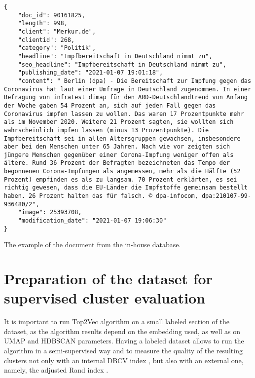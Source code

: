 \documentclass[fontsize=12pt,a4paper,twoside,openany]{scrbook}
\begin{document}
\begin{listing}[ht!]
\begin{verbatim}
{
    "doc_id": 90161825, 
    "length": 998, 
    "client": "Merkur.de", 
    "clientid": 268, 
    "category": "Politik", 
    "headline": "Impfbereitschaft in Deutschland nimmt zu", 
    "seo_headline": "Impfbereitschaft in Deutschland nimmt zu", 
    "publishing_date": "2021-01-07 19:01:18", 
    "content": " Berlin (dpa) - Die Bereitschaft zur Impfung gegen das Coronavirus hat laut einer Umfrage in Deutschland zugenommen. In einer Befragung von infratest dimap für den ARD-Deutschlandtrend von Anfang der Woche gaben 54 Prozent an, sich auf jeden Fall gegen das Coronavirus impfen lassen zu wollen. Das waren 17 Prozentpunkte mehr als im November 2020. Weitere 21 Prozent sagten, sie wollten sich wahrscheinlich impfen lassen (minus 13 Prozentpunkte). Die Impfbereitschaft sei in allen Altersgruppen gewachsen, insbesondere aber bei den Menschen unter 65 Jahren. Nach wie vor zeigten sich jüngere Menschen gegenüber einer Corona-Impfung weniger offen als ältere. Rund 36 Prozent der Befragten bezeichneten das Tempo der begonnenen Corona-Impfungen als angemessen, mehr als die Hälfte (52 Prozent) empfinden es als zu langsam. 70 Prozent erklärten, es sei richtig gewesen, dass die EU-Länder die Impfstoffe gemeinsam bestellt haben. 26 Prozent halten das für falsch. © dpa-infocom, dpa:210107-99-936480/2", 
    "image": 25393708, 
    "modification_date": "2021-01-07 19:06:30"
}

\end{verbatim}
\caption{The example of the document from the in-house database.} 
\label{listing:json-example}
\end{listing}
 
\section{Preparation of the dataset for supervised cluster evaluation}
\label{sec:exp_setup}

It is important to run Top2Vec algorithm on a small labeled section of the dataset, as the algorithm results depend on the embedding used, as well as on UMAP and HDBSCAN parameters. Having a labeled dataset allows to run the algorithm in a semi-supervised way and to measure the quality of the resulting clusters not only with an internal DBCV index \parencite{Moulavi14}, but also with an external one, namely, the adjusted Rand index \parencite{Hubert85}. 
\end{document}
